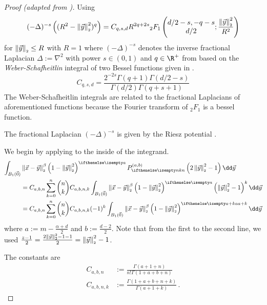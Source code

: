 \begin{proof}[Proof (adapted from \cite{2021-arbitrary-dimensions})]
  Using
  $$(-\Delta)^{-s} \left((R^2 - \left\lVert\vec{y}\right\rVert_{\scriptscriptstyle 2}^2)^q\right) = C_{q, s, d} R^{2q+2s} {}_2F_1\left(\begin{matrix}d/2 - s, -q-s \\ d/2 \end{matrix}; \frac{\left\lVert\vec{y}\right\rVert_{\scriptscriptstyle 2}^2}{R^2}\right)$$
  for $\left\lVert\vec{y}\right\rVert_{\scriptscriptstyle 2} \le R$ with $R = 1$ where $(-\Delta)^{-s}$ denotes the inverse fractional Laplacian $\Delta := \nabla^2$ with power $s \in (0, 1)$ and $q \in \R^+$
  from \cite{2014-barenblatt} based on the \textit{Weber-Schafheitlin} integral of two Bessel functions given in \cite{1945-bessel-integral}.
  $$C_{q,s,d} = \frac{2^{-2s} \Gamma(q+1) \Gamma(d/2-s)}{\Gamma(d/2) \Gamma(q+s+1)}$$
  The Weber-Schafheitlin integrals are related to the fractional Laplacians of aforementioned functions because the Fourier transform of ${}_2F_1$ is a bessel function.

  The fractional Laplacian $(-\Delta)^{-s}$ is given by the Riesz potential \cite{2015-fractional-laplacian-definitions}.

  We begin by applying  to the inside of the integrand.
  \begin{align*}
    \int_{B_1(\vec{0})} & \norm{\vec{x}-\vec{y}}^\beta \weight{y} \jacobi[n]{y} \dd\vec{y}                                                                                             \\
                        & = C_{a,b,n} \sum_{k=0}^n \binom{n}{k} C_{a,b,n,k} \int_{B_1(\vec{0})} \norm{\vec{x}-\vec{y}}^\beta \weight{y} \left(\norm{\vec{y}}^2 - 1\right)^k \dd\vec{y} \\
                        & = C_{a,b,n} \sum_{k=0}^n \binom{n}{k} C_{a,b,n,k} (-1)^k \int_{B_1(\vec{0})} \norm{\vec{x}-\vec{y}}^\beta \weight[a+k]{y} \dd\vec{y}
  \end{align*}
  where $a := m-\frac{\alpha+d}{2}$ and $b := \frac{d-2}{2}$.
  Note that from the first to the second line, we used $\frac{z-1}{2} = \frac{2\left\lVert\vec{y}\right\rVert_{\scriptscriptstyle 2}^2-1 - 1}{2} = \left\lVert\vec{y}\right\rVert_{\scriptscriptstyle 2}^2 - 1$.

  The constants are
  \begin{align*}
    C_{a,b,n}   & := \frac{\Gamma(a+1+n)}{n! \Gamma(1+a+b+n)}     \\
    C_{a,b,n,k} & := \frac{\Gamma(1+a+b+n + k)}{\Gamma(a+1+k)}\,.
  \end{align*}


\end{proof}
